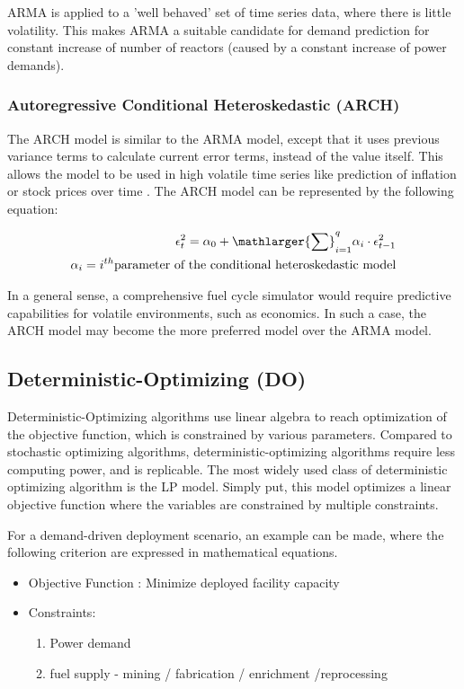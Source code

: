\gls{ARMA} is applied to a 'well behaved' set of time series data,
where there is little volatility. This makes \gls{ARMA} a suitable
candidate for demand prediction for constant increase of number of
reactors (caused by a constant increase of power demands).


\subsubsection{Autoregressive Conditional Heteroskedastic (ARCH)}
The \gls{ARCH} model is similar to the \gls{ARMA} model, except that
it uses previous variance terms to calculate current error terms, instead
of the value itself. This allows the model to be used in high volatile 
time series like prediction of inflation or stock prices over time 
\cite{bollerslev_generalized_1986}.
The \gls{ARCH} model can be represented by the following equation:

\begin{align}
	\epsilon_t^2 = \alpha_0+{\mathlarger{\sum}}_{i=1}^{q}\alpha_i\cdot\epsilon_{t-1}^2\\
	\alpha_i= i^{th} \mbox{parameter of the conditional heteroskedastic model}
\end{align}


In a general sense, a comprehensive fuel cycle simulator would require
predictive capabilities for volatile environments, such as economics.
In such a case, the \gls{ARCH} model may become the more preferred model
over the \gls{ARMA} model.



\subsection{Deterministic-Optimizing (DO)}
Deterministic-Optimizing algorithms use linear algebra to
reach optimization of the objective function, which is
constrained by various parameters. Compared to stochastic
optimizing algorithms, deterministic-optimizing algorithms
require less computing power, and is replicable. The most
widely used class of deterministic optimizing algorithm
is the \gls{LP} model. Simply put, this model optimizes a
linear objective function where the variables are constrained
by multiple constraints.

For a demand-driven deployment scenario, an example can be made,
where the following criterion are expressed in mathematical equations.

\begin{itemize}
	\item[] Objective Function : Minimize deployed facility capacity
	\item[] Constraints:
	\begin{enumerate}
		\item Power demand
		\item fuel supply - mining / fabrication / enrichment /reprocessing
	\end{enumerate}
		
\end{itemize}



